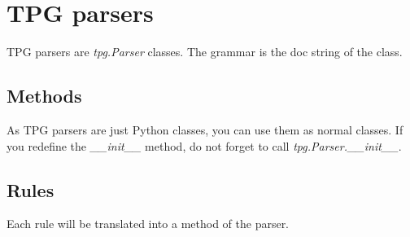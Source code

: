 \section{TPG parsers}                                       \label{grammar:parser}

TPG parsers are \emph{tpg.Parser} classes.
The grammar is the doc string of the class.

\subsection{Methods}

As TPG parsers are just Python classes, you can use them as normal classes.
If you redefine the \emph{\_\_init\_\_} method, do not forget to call \emph{tpg.Parser.\_\_init\_\_}.

\subsection{Rules}

Each rule will be translated into a method of the parser.

